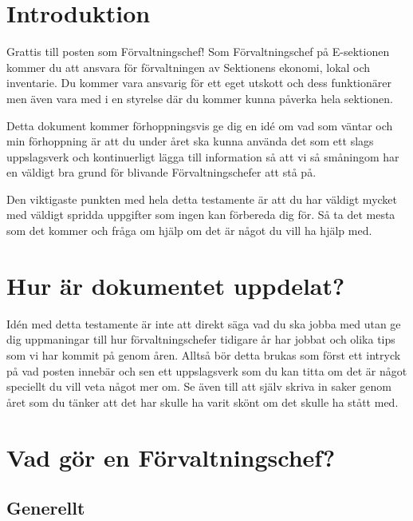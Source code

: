 \documentclass[10pt]{article}
\begin{document}
\heading{\doctitle}

\section{Introduktion}
Grattis till posten som Förvaltningschef! Som Förvaltningschef på E-sektionen kommer du att ansvara för förvaltningen av Sektionens ekonomi, lokal och inventarie. Du kommer vara ansvarig för ett eget utskott och dess funktionärer men även vara med i en styrelse där du kommer kunna påverka hela sektionen. 

Detta dokument kommer förhoppningsvis ge dig en idé om vad som väntar och min förhoppning är att du under året ska kunna använda det som ett slags uppslagsverk och kontinuerligt lägga till information så att vi så småningom har en väldigt bra grund för blivande Förvaltningschefer att stå på.

Den viktigaste punkten med hela detta testamente är att du har väldigt mycket med väldigt spridda uppgifter som ingen kan förbereda dig för. Så ta det mesta som det kommer och fråga om hjälp om det är något du vill ha hjälp med.

\section{Hur är dokumentet uppdelat?}
Idén med detta testamente är inte att direkt säga vad du ska jobba med utan ge dig uppmaningar till hur förvaltningschefer tidigare år har jobbat och olika tips som vi har kommit på genom åren. Alltså bör detta brukas som först ett intryck på vad posten innebär och sen ett uppslagsverk som du kan titta om det är något speciellt du vill veta något mer om. Se även till att själv skriva in saker genom året som du tänker att det har skulle ha varit skönt om det skulle ha stått med.

\section{Vad gör en Förvaltningschef?}
\subsection{Generellt}
\end{document}
